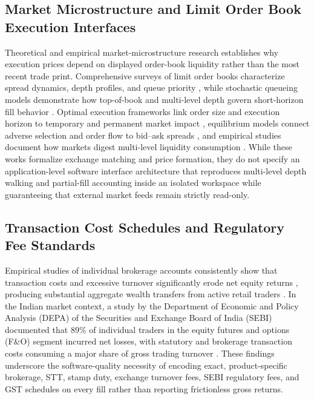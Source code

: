 \documentclass[12pt]{article}
\begin{document}
\subsection{Market Microstructure and Limit Order Book Execution Interfaces}
Theoretical and empirical market-microstructure research establishes why execution prices depend on displayed order-book liquidity rather than the most recent trade print. Comprehensive surveys of limit order books characterize spread dynamics, depth profiles, and queue priority \cite{gould2013}, while stochastic queueing models demonstrate how top-of-book and multi-level depth govern short-horizon fill behavior \cite{cont2010}. Optimal execution frameworks link order size and execution horizon to temporary and permanent market impact \cite{almgren2001}, equilibrium models connect adverse selection and order flow to bid--ask spreads \cite{kyle1985,glosten1985}, and empirical studies document how markets digest multi-level liquidity consumption \cite{bouchaud2009,hasbrouck2007,harris2003}. While these works formalize exchange matching and price formation, they do not specify an application-level software interface architecture that reproduces multi-level depth walking and partial-fill accounting inside an isolated workspace while guaranteeing that external market feeds remain strictly read-only.

\subsection{Transaction Cost Schedules and Regulatory Fee Standards}
Empirical studies of individual brokerage accounts consistently show that transaction costs and excessive turnover significantly erode net equity returns \cite{barber2000,barber2002}, producing substantial aggregate wealth transfers from active retail traders \cite{barber2009}. In the Indian market context, a study by the Department of Economic and Policy Analysis (DEPA) of the Securities and Exchange Board of India (SEBI) documented that 89\% of individual traders in the equity futures and options (F\&O) segment incurred net losses, with statutory and brokerage transaction costs consuming a major share of gross trading turnover \cite{sebi2023}. These findings underscore the software-quality necessity of encoding exact, product-specific brokerage, STT, stamp duty, exchange turnover fees, SEBI regulatory fees, and GST schedules on every fill rather than reporting frictionless gross returns.
\end{document}
